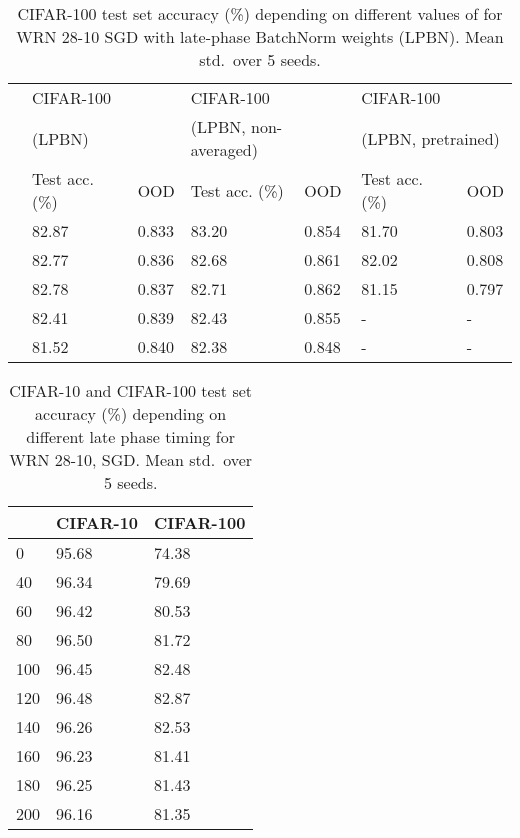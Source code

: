 \documentclass{article} \usepackage{iclr2021_conference,times}
\begin{document}
\begin{table}
\centering
\caption{CIFAR-100 test set accuracy (\%) depending on different values of  for WRN 28-10 SGD with late-phase BatchNorm weights (LPBN). Mean  std.~over 5 seeds.\label{tab:sigma-sensitivity}}
\begin{tabular}{lllllll}
\toprule
& \multicolumn{2}{l}{CIFAR-100} &  \multicolumn{2}{l}{CIFAR-100} & \multicolumn{2}{l}{CIFAR-100} \\
& \multicolumn{2}{l}{(LPBN)}  &   \multicolumn{2}{l}{(LPBN, non-averaged)}  & \multicolumn{2}{l}{(LPBN, pretrained)} \\
\midrule
 & Test acc. (\%) & OOD&Test acc. (\%) & OOD&Test acc. (\%) & OOD \\\midrule
 & 82.87& 0.833 &83.20&0.854 & 81.70    &0.803   \\
  & 82.77& 0.836 &82.68 & 0.861& 82.02  &0.808  \\
  & 82.78 & 0.837 & 82.71& 0.862& 81.15 &0.797   \\
  &  82.41& 0.839&82.43 & 0.855& - &- \\
  &  81.52& 0.840 &82.38& 0.848&  - & - \\ \bottomrule  
\end{tabular}
\end{table}


\begin{wraptable}[18]{R}{0.45\textwidth}
\centering
\caption{CIFAR-10 and CIFAR-100 test set accuracy (\%) depending on different late phase timing  for WRN 28-10, SGD. Mean  std.~over 5 seeds.\label{tab:t0-sensitivity}}
\vspace{-0.2cm}
\begin{tabular}{lll}
\toprule
    & CIFAR-10 & CIFAR-100   \\\midrule
0 &  95.68  &  74.38\\
40 &  96.34 &   79.69    \\
60 &  96.42 & 80.53\\
80 &  96.50 & 81.72 \\
100 &  96.45 & 82.48 \\
120 &  96.48 & 82.87 \\
140 &  96.26 & 82.53 \\
160 &  96.23 & 81.41 \\
180 &  96.25 & 81.43 \\
200 &  96.16 & 81.35 \\\bottomrule  
\end{tabular}
\end{wraptable}
\end{document}
